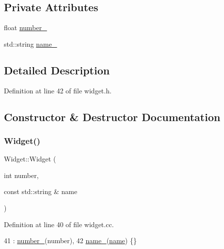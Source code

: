 \subsection*{Private Attributes}
\begin{DoxyCompactItemize}
\item 
float \hyperlink{classWidget_a27a2b3fd66372d5731fa9a6bcaab755b}{number\+\_\+}
\item 
std\+::string \hyperlink{classWidget_a1d2f74810f3f912270a681e0671a7a55}{name\+\_\+}
\end{DoxyCompactItemize}


\subsection{Detailed Description}


Definition at line 42 of file widget.\+h.



\subsection{Constructor \& Destructor Documentation}
\mbox{\label{classWidget_ab573b75a8a69d29c298af2485fb9cda9}} 
\subsubsection{\texorpdfstring{Widget()}{Widget()}}
{\footnotesize\ttfamily Widget\+::\+Widget (\begin{DoxyParamCaption}\item[{int}]{number,  }\item[{const std\+::string \&}]{name }\end{DoxyParamCaption})}



Definition at line 40 of file widget.\+cc.


\begin{DoxyCode}
41     : \hyperlink{classWidget_a27a2b3fd66372d5731fa9a6bcaab755b}{number\_}(number),
42       \hyperlink{classWidget_a1d2f74810f3f912270a681e0671a7a55}{name\_}(\hyperlink{namespaceinteractive__marker_a447655961b3d3ca3c5a2a9d3d769436d}{name}) \{\}
\end{DoxyCode}
\mbox{\label{classWidget_aa24f66bcbaaec6d458b0980e8c8eae65}} 
